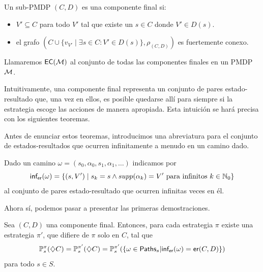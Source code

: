 \begin{definition} \label{defEC}
	Un sub-PMDP $(C, D)$ es una componente final si:

	\begin{itemize}
		\item $V' \subseteq C$ para todo $V'$ tal que existe un $s \in C$ donde $V' \in D(s)$.

		\item el grafo $(C \cup \{v_{V'} \mid \exists s \in C : V' \in D(s)\}, \rho_{(C,D)})$
		      es fuertemente conexo.
	\end{itemize}

	Llamaremos $\textsf{EC}(\mathcal{M})$ al conjunto de todas las componentes finales en un PMDP
	$\mathcal{M}$.
\end{definition}

Intuitivamente, una componente final representa un conjunto de pares
estado-resultado que, una vez en ellos, es posible quedarse allí para siempre
si la estrategia escoge las acciones de manera apropiada. Esta intuición se
hará precisa con los siguientes teoremas.

Antes de enunciar estos teoremas, introducimos una abreviatura para el conjunto
de estados-resultados que ocurren infinitamente a menudo en un camino dado. %

\begin{definition}[$\inft$]
	Dado un camino $\omega = (s_0, \alpha_0, s_1, \alpha_1, \dots)$ indicamos por
	\[
		\textsf{inf}_\textsf{er} (\omega) = \{(s, V') \mid s_k = s \wedge supp(\alpha_k) = V' \text{ para infinitos } k \in \mathbb{N}_0\}
	\]
	al conjunto de pares estado-resultado que ocurren infinitas veces en él.
\end{definition}

Ahora sí, podemos pasar a presentar las primeras demostraciones.

\begin{theorem}
	\label{teoEstabilidadEC}
	Sea $(C, D)$ una componente final. Entonces, para cada estrategia $\pi$ existe una estrategia $\pi'$, que difiere de $\pi$ solo en $C$, tal que
	\begin{equation} \label{estabEC}
		\mathbb{P}^\pi_s(\diamondsuit C) = \mathbb{P}^{\pi'}_s(\diamondsuit C) = \mathbb{P}^{\pi'}_s(\{ \omega \in \textsf{Paths}_s | \textsf{inf}_\textsf{er}(\omega) = \textsf{er}(C,D)\})
	\end{equation}
	para todo $s \in S$.
\end{theorem}

